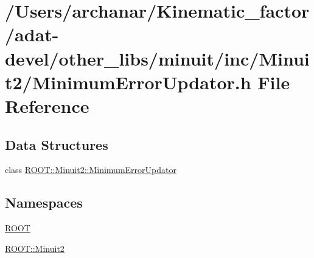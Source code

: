 \hypertarget{adat-devel_2other__libs_2minuit_2inc_2Minuit2_2MinimumErrorUpdator_8h}{}\section{/\+Users/archanar/\+Kinematic\+\_\+factor/adat-\/devel/other\+\_\+libs/minuit/inc/\+Minuit2/\+Minimum\+Error\+Updator.h File Reference}
\label{adat-devel_2other__libs_2minuit_2inc_2Minuit2_2MinimumErrorUpdator_8h}
\subsection*{Data Structures}
\begin{DoxyCompactItemize}
\item 
class \mbox{\hyperlink{classROOT_1_1Minuit2_1_1MinimumErrorUpdator}{R\+O\+O\+T\+::\+Minuit2\+::\+Minimum\+Error\+Updator}}
\end{DoxyCompactItemize}
\subsection*{Namespaces}
\begin{DoxyCompactItemize}
\item 
 \mbox{\hyperlink{namespaceROOT}{R\+O\+OT}}
\item 
 \mbox{\hyperlink{namespaceROOT_1_1Minuit2}{R\+O\+O\+T\+::\+Minuit2}}
\end{DoxyCompactItemize}
